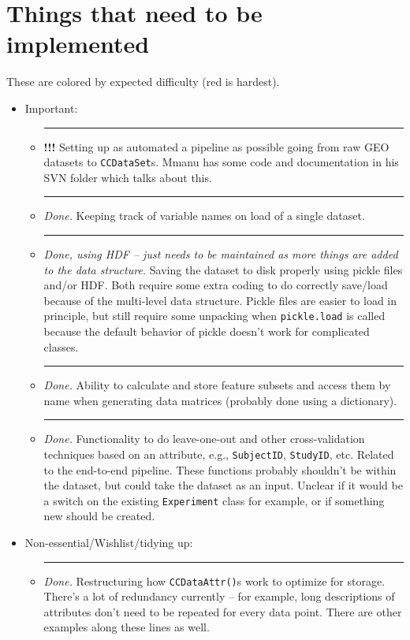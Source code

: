 \documentclass{article}
\newcommand{\ttt}{\texttt}
\newcommand\crule[3][black]{\textcolor{#1}{\rule{#2}{#3}}}
\newcommand{\hardtask}{%
  \crule[red]{0.7em}{0.7em}\;%
}
\newcommand{\donetask}{%
  \crule[black]{0.7em}{0.7em}\;%
}
\begin{document}
\section{Things that need to be implemented}
These are colored by expected difficulty (red is hardest).
\begin{itemize}
  \item Important:
  \begin{itemize}
    \item \hardtask \textbf{!!!} Setting up as automated a pipeline as possible going
    from raw GEO datasets to \ttt{CCDataSet}s. Mmanu has some code and documentation
    in his SVN folder which talks about this.
    \item \donetask \emph{Done.} Keeping track of variable names on load of a single dataset.
    \item \donetask \emph{Done, using HDF -- just needs to be maintained as more things are
    added to the data structure.} Saving the dataset to disk properly using pickle files and/or HDF.
    Both require some extra coding to do correctly save/load because of the
    multi-level data structure. Pickle files are easier to load in principle, but
    still require some unpacking when \ttt{pickle.load} is called because the
    default behavior of pickle doesn't work for complicated classes.
    \item \donetask \emph{Done.} Ability to calculate and store feature
    subsets and access them by name when generating data matrices (probably
    done using a dictionary).
    \item \donetask \emph{Done.} Functionality to do leave-one-out
    and other cross-validation techniques based on an
    attribute, e.g., \ttt{SubjectID}, \ttt{StudyID}, etc. Related to the
    end-to-end pipeline. These functions probably shouldn't be within the
    dataset, but could take the dataset as an input. Unclear if it would be a
    switch on the existing \ttt{Experiment} class for example, or if something
    new should be created.
  \end{itemize}
  \item Non-essential/Wishlist/tidying up:
  \begin{itemize}
    \item \donetask \emph{Done.} Restructuring how \ttt{CCDataAttr()}s work to optimize for storage.
    There's a lot of redundancy currently -- for example, long descriptions of
    attributes don't need to be repeated for every data point. There are other
    examples along these lines as well.

\end{itemize}
\end{itemize}
\end{document}
